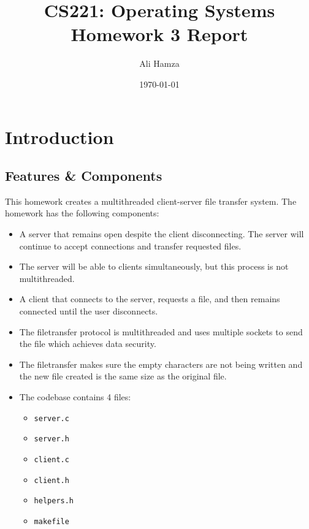 \documentclass{article}
\title{CS221: Operating Systems\\ \Huge Homework 3 Report}
\author{Ali Hamza}
\date{\today}
\begin{document}
\maketitle    
\section{Introduction}
\subsection{Features \& Components}
This homework creates a multithreaded client-server file transfer system. The homework has the following components:
\begin{itemize}
    \item A server that remains open despite the client disconnecting. The server will continue to accept connections and transfer requested files.
    \item The server will be able to clients simultaneously, but this process is not multithreaded.
    \item A client that connects to the server, requests a file, and then remains connected until the user disconnects.
    \item The filetransfer protocol is multithreaded and uses multiple sockets to send the file which achieves data security.
    \item The filetransfer makes sure the empty characters are not being written and the new file created is the same size as the original file.
    \item The codebase contains 4 files:
        \begin{itemize}
            \item \texttt{server.c}
            \item \texttt{server.h}
            \item \texttt{client.c}
            \item \texttt{client.h}
            \item \texttt{helpers.h}
            \item \texttt{makefile}
            \end{itemize}
\end{itemize}
\end{document}
